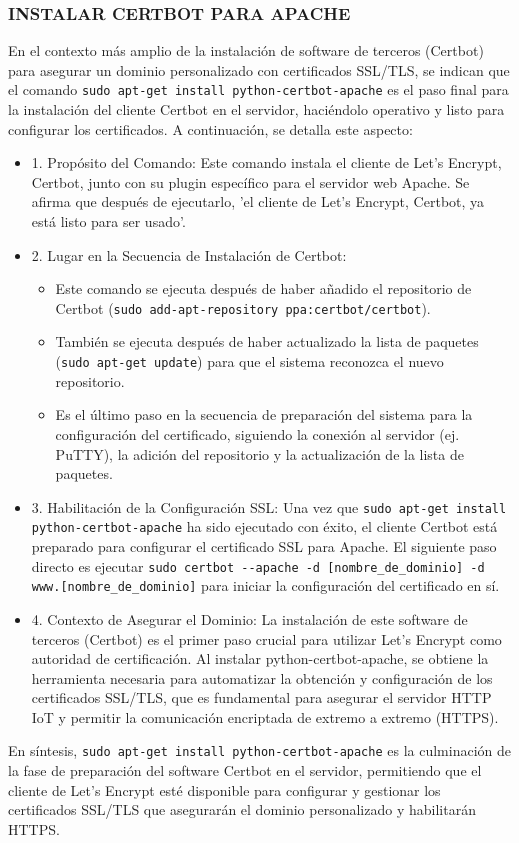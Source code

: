 \documentclass{report}
\begin{document}
\subsubsection{INSTALAR CERTBOT PARA APACHE}
En el contexto más amplio de la instalación de software de terceros (Certbot) para asegurar un dominio personalizado con certificados 
SSL/TLS, se  indican que el comando \verb|sudo apt-get install python-certbot-apache| es el paso final para la instalación del 
cliente Certbot en el servidor, haciéndolo operativo y listo para configurar los certificados.
A continuación, se detalla este aspecto:
\begin{itemize}
    \item 1. Propósito del Comando: Este comando instala el cliente de Let's Encrypt, Certbot, junto con su plugin específico para 
    el servidor web Apache. Se afirma que después de ejecutarlo, 'el cliente de Let's Encrypt, Certbot, ya está listo para ser usado'.
    \item 2. Lugar en la Secuencia de Instalación de Certbot:
        \begin{itemize}
            \item Este comando se ejecuta después de haber añadido el repositorio de Certbot (\verb|sudo add-apt-repository ppa:certbot/certbot|).
            \item También se ejecuta después de haber actualizado la lista de paquetes (\verb|sudo apt-get update|) para que el sistema reconozca 
            el nuevo repositorio.
            \item Es el último paso en la secuencia de preparación del sistema para la configuración del certificado, siguiendo la conexión 
            al servidor (ej. PuTTY), la adición del repositorio y la actualización de la lista de paquetes.
        \end{itemize}
    \item 3. Habilitación de la Configuración SSL: Una vez que \verb|sudo apt-get install python-certbot-apache| ha sido ejecutado con éxito, 
    el cliente Certbot está preparado para configurar el certificado SSL para Apache. El siguiente paso directo es ejecutar 
    \verb|sudo certbot --apache -d [nombre_de_dominio] -d www.[nombre_de_dominio]| para iniciar la configuración del certificado en sí.
    \item 4. Contexto de Asegurar el Dominio: La instalación de este software de terceros (Certbot) es el primer paso crucial para utilizar 
    Let's Encrypt como autoridad de certificación. Al instalar python-certbot-apache, se obtiene la herramienta necesaria para automatizar 
    la obtención y configuración de los certificados SSL/TLS, que es fundamental para asegurar el servidor HTTP IoT y permitir la comunicación 
    encriptada de extremo a extremo (HTTPS).
\end{itemize}
En síntesis, \verb|sudo apt-get install python-certbot-apache| es la culminación de la fase de preparación del software Certbot 
en el servidor, permitiendo que el cliente de Let's Encrypt esté disponible para configurar y gestionar los certificados SSL/TLS 
que asegurarán el dominio personalizado y habilitarán HTTPS.
\end{document}
